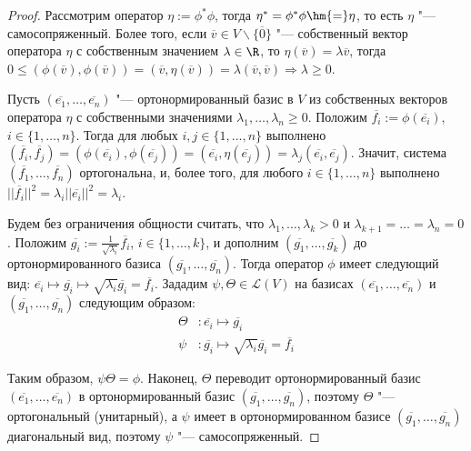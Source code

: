 \begin{proof}
    Рассмотрим оператор $\eta := \phi^*\phi$, тогда $\eta^* = \phi^*\phi \hm{=} \eta$, то есть $\eta$ "--- самосопряженный. Более того, если $\overline{v} \in V \backslash \{\overline{0}\}$ "--- собственный вектор оператора $\eta$ с собственным значением $\lambda \in \R$, то $\eta(\overline{v}) = \lambda\overline{v}$, тогда $0 \le (\phi(\overline{v}), \phi(\overline{v})) = (\overline{v}, \eta(\overline{v})) = \lambda(\overline{v}, \overline{v}) \Rightarrow \lambda \ge 0$.
    
    Пусть $(\overline{e_1}, \dots, \overline{e_n})$ "--- ортонормированный базис в $V$ из собственных векторов оператора $\eta$ с собственными значениями $\lambda_1, \dotsc, \lambda_n \ge 0$. Положим $\overline{f_i} := \phi(\overline{e_i})$, $i \in \{1, \dotsc, n\}$. Тогда для любых $i, j \in \{1, \dots, n\}$ выполнено $(\overline{f_i}, \overline{f_j}) = (\phi(\overline{e_i}), \phi(\overline{e_j})) = (\overline{e_i}, \eta(\overline{e_j})) = \lambda_j(\overline{e_i}, \overline{e_j})$. Значит, система $(\overline{f_1}, \dots, \overline{f_n})$ ортогональна, и, более того, для любого $i \in \{1, \dotsc, n\}$ выполнено $||\overline{f_i}||^2 = \lambda_i||\overline{e_i}||^2 = \lambda_i$.
    
    Будем без ограничения общности считать, что $\lambda_1, \dots, \lambda_k > 0$ и $\lambda_{k + 1} = \dots = \lambda_n = 0$. Положим $\overline{g_i} := \frac{1}{\sqrt{\lambda_i}}\overline{f_i}$, $i \in \{1, \dots, k\}$, и дополним $(\overline{g_1}, \dots, \overline{g_k})$ до ортонормированного базиса $(\overline{g_1}, \dots, \overline{g_n})$. Тогда оператор $\phi$ имеет следующий вид:
    $\overline{e_i} \mapsto \overline{g_i} \mapsto \sqrt{\lambda_{i}}\overline{g_i} = \overline{f_i}$. Зададим $\psi, \Theta \in \mathcal{L}(V)$ на базисах $(\overline{e_1}, \dots, \overline{e_n})$ и $(\overline{g_1}, \dots, \overline{g_n})$ следующим образом:
    \begin{align*}
        \Theta&: \overline{e_i} \mapsto \overline{g_i}\\
        \psi&: \overline{g_i} \mapsto \sqrt{\lambda_{i}}\overline{g_i} = \overline{f_i}
    \end{align*}
    
    Таким образом, $\psi\Theta = \phi$. Наконец, $\Theta$ переводит ортонормированный базис $(\overline{e_1}, \dots, \overline{e_n})$ в ортонормированный базис $(\overline{g_1}, \dots, \overline{g_n})$, поэтому $\Theta$ "--- ортогональный (унитарный), а $\psi$ имеет в ортонормированном базисе $(\overline{g_1}, \dots, \overline{g_n})$ диагональный вид, поэтому $\psi$ "--- самосопряженный.
\end{proof}


